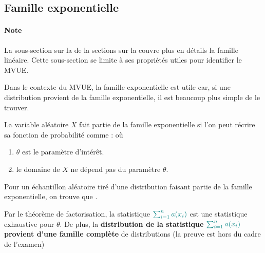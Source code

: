 \documentclass[french]{article}
\begin{document}
\begin{multicols*}{2}
\columnbreak
\subsection{Famille exponentielle}\label{subsec:FamExpMVUE}
\paragraph{Note}	La sous-section sur la \underline{\textit{}} de la sections sur la \underline{\textit{}} couvre plus en détails la famille linéaire. Cette sous-section se limite à ses propriétés utiles pour identifier le MVUE.

\bigskip

\begin{rappel_enhanced}[Contexte]
Dans le contexte du MVUE, la famille exponentielle est utile car, si une distribution provient de la famille exponentielle, il est beaucoup plus simple de le trouver.
\end{rappel_enhanced}

\begin{definitionNOHFILL}
La variable aléatoire $X$ fait partie de la famille exponentielle si l'on peut récrire sa fonction de probabilité comme :  où 
\begin{enumerate}[label = \circled{\arabic*}{trueblue}]
	\item	$\theta$ est le paramètre d'intérêt.
	\item	le domaine de $X$ ne dépend pas du paramètre $\theta$.
\end{enumerate}
\end{definitionNOHFILL}

\begin{definitionNOHFILLprop}
Pour un échantillon aléatoire tiré d'une distribution faisant partie de la famille exponentielle, on trouve que .

\bigskip

Par le théorème de factorisation, la statistique $\textcolor{teal}{\sum_{i = 1}^{n} a(x_{i})}$ est une statistique exhaustive pour $\theta$. De plus, la \textbf{distribution de la statistique} $\textcolor{teal}{\sum_{i = 1}^{n} a(x_{i})}$ \textbf{provient d'une famille complète} de distributions (la preuve est hors du cadre de l'examen)
\end{definitionNOHFILLprop}


\end{multicols*}
\end{document}
